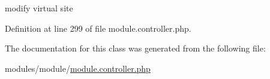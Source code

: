 modify virtual site 



Definition at line 299 of file module.\+controller.\+php.



The documentation for this class was generated from the following file\+:\begin{DoxyCompactItemize}
\item 
modules/module/\hyperlink{module_8controller_8php}{module.\+controller.\+php}\end{DoxyCompactItemize}
